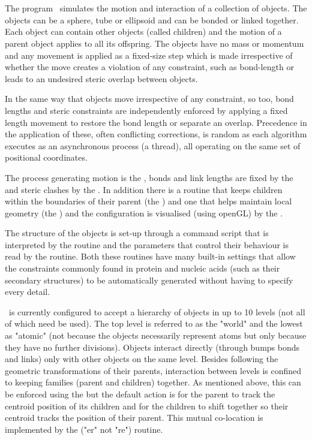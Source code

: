 \section{}

The program \NAME\ simulates the motion and interaction of a collection of objects.
The objects can be a sphere, tube or ellipsoid and can be bonded or linked together.
Each object can contain other objects (called children) and the motion of a parent
object applies to all its offspring.   The objects have no mass or momentum and any
movement is applied as a fixed-size step which is made irrespective of whether the
move creates a violation of any constraint, such as bond-length or leads to an 
undesired steric overlap between objects.   

In the same way that objects move irrespective of any constraint, so too, bond
lengths and steric constraints are independently enforced by applying a fixed length
movement to restore the bond length or separate an overlap.  Precedence in the application
of these, often conflicting corrections, is random as each algorithm executes as an
asynchronous process (a thread), all operating on the same set of positional coordinates.

The process generating motion is the , bonds and link lengths are fixed
by the  and steric clashes by the .   In addition there is a 
routine that keeps children within the boundaries of their parent (the 
) and one that helps maintain local geometry (the ) and the
configuration is visualised (using openGL) by the .

The structure of the objects is set-up through a command script that is interpreted
by the  routine and the parameters that control their behaviour is read
by the  routine.   Both these routines have many built-in settings that
allow the constraints commonly found in protein and nucleic acids (such as their
secondary structures) to be automatically generated without having to specify every
detail.

\NAME\ is currently configured to accept a hierarchy of objects in up to 10 levels
(not all of which need be used).   The top level is referred to as the "world" and
the lowest as "atomic" (not because the objects necessarily represent atoms but only
because they have no further divisions).  Objects interact directly (through bumps
bonds and links) only with other objects on the same level.   Besides following the
geometric transformations of their parents, interaction between levels is confined 
to keeping families (parent and children) together.   As mentioned above, this can
be enforced using the  but the default action is for the parent to track
the centroid position of its children and for the children to shift together so their
centroid tracks the position of their parent.   This mutual co-location is implemented
by the  ("er" not "re") routine.

